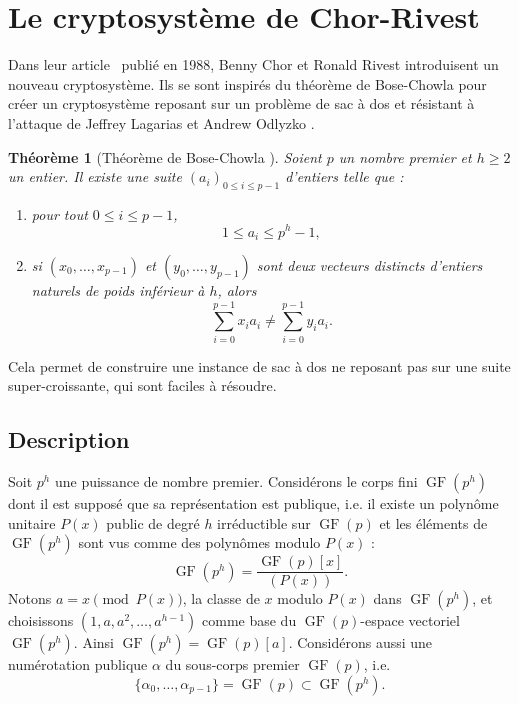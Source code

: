 \documentclass[a4paper, titlepage, 11pt]{article}
\newtheorem{theo}{Théorème}[section]
\theoremstyle{definition}
\theoremstyle{remark}
\def\gf{\operatorname{GF}}
\begin{document}
\section{Le cryptosystème de Chor-Rivest}\label{sec:cryptosysteme}

Dans leur article~\cite{chorRivest1988} publié en 1988, Benny Chor et Ronald Rivest introduisent un nouveau cryptosystème. Ils se sont inspirés du théorème de Bose-Chowla \cite[III]{chorRivest1988} pour créer un cryptosystème reposant sur un problème de sac à dos et résistant à l'attaque de Jeffrey Lagarias et Andrew Odlyzko \cite{lagarias1983}.
\begin{theo}[Théorème de Bose-Chowla \cite{bose1962}]
Soient $p$ un nombre premier et $h \geqslant 2$ un entier. Il existe une suite ${(a_i)}_{0\leqslant i \leqslant p-1}$ d'entiers telle que : \begin{enumerate}
\item pour tout $0 \leqslant i \leqslant p-1$, $$1 \leqslant a_i \leqslant p^h-1,$$
\item si $(x_0, \dots, x_{p-1})$ et $(y_0, \dots, y_{p-1})$ sont deux vecteurs distincts d'entiers naturels de poids inférieur à $h$, alors 
$$\sum_{i=0}^{p-1} x_ia_i \neq \sum_{i=0}^{p-1} y_ia_i.$$
\end{enumerate}
\end{theo}

Cela permet de construire une instance de sac à dos ne reposant pas sur une suite super-croissante, qui sont faciles à résoudre.

\subsection*{Description}

Soit $p^h$ une puissance de nombre premier. Considérons le corps fini $\gf(p^h)$ dont il est supposé que sa représentation est publique, i.e. il existe un polynôme unitaire $P(x)$ public de degré $h$ irréductible sur $\gf(p)$ et les éléments de $\gf(p^h)$ sont vus comme des polynômes modulo $P(x)$ :
$$\gf(p^h) = \frac{\gf(p)[x]}{(P(x))}.$$
Notons $a = x \pmod{P(x)}$, la classe de $x$ modulo $P(x)$ dans $\gf(p^h)$, et choisissons $(1, a, a^2, \dots, a^{h-1})$ comme base du $\gf(p)$-espace vectoriel $\gf(p^h)$. Ainsi $\gf(p^h) = \gf(p)[a]$. Considérons aussi une numérotation publique $\alpha$ du sous-corps premier $\gf(p)$, i.e. $$\{\alpha_0,\dots, \alpha_{p-1}\} = \gf(p) \subset \gf(p^h).$$
\end{document}
